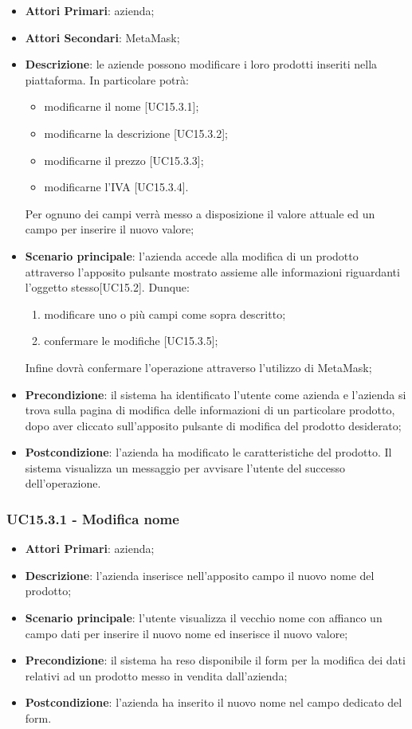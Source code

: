 \begin{itemize}
	\item \textbf{Attori Primari}: azienda;
	\item \textbf{Attori Secondari}: MetaMask\glo;
	\item \textbf{Descrizione}: le aziende possono modificare i loro prodotti inseriti nella piattaforma. In particolare potrà:
	 \begin{itemize}
		\item modificarne il nome [UC15.3.1];
		\item modificarne la descrizione [UC15.3.2];
		\item modificarne il prezzo [UC15.3.3];
		\item modificarne l'IVA [UC15.3.4].
		
	\end{itemize}
	Per ognuno dei campi verrà messo a disposizione il valore attuale ed un campo per inserire il nuovo valore;

	\item \textbf{Scenario principale}: l'azienda accede alla modifica di un prodotto attraverso l'apposito pulsante mostrato assieme alle informazioni riguardanti l'oggetto stesso[UC15.2]. Dunque: 
	\begin{enumerate}[label=\alph*.]
		\item modificare uno o più campi come sopra descritto;
		\item confermare le modifiche [UC15.3.5];
	\end{enumerate}
	Infine dovrà confermare l'operazione attraverso l'utilizzo di MetaMask\glo{};
	
	\item \textbf{Precondizione}: il sistema ha identificato l'utente come azienda e l'azienda si trova sulla pagina di modifica delle informazioni di un particolare prodotto, dopo aver cliccato sull'apposito pulsante di modifica del prodotto desiderato;
	\item \textbf{Postcondizione}: l'azienda ha modificato le caratteristiche del prodotto. Il sistema visualizza un messaggio per avvisare l'utente del successo dell'operazione.
\end{itemize}

\subsubsection{UC15.3.1 - Modifica nome}
\begin{itemize}
	\item \textbf{Attori Primari}: azienda;
	\item \textbf{Descrizione}: l'azienda inserisce nell'apposito campo il nuovo nome del prodotto;
	\item \textbf{Scenario principale}: l'utente visualizza il vecchio nome con affianco un campo dati per inserire il nuovo nome ed inserisce il nuovo valore;
	\item \textbf{Precondizione}: il sistema ha reso disponibile il form per la modifica dei dati relativi ad un prodotto messo in vendita dall'azienda;
	\item \textbf{Postcondizione}: l'azienda ha inserito il nuovo nome nel campo dedicato del form.
\end{itemize}

